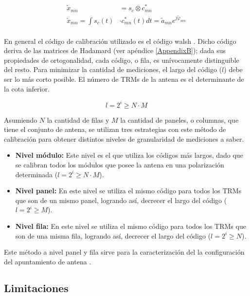 \begin{equation}
\begin{aligned}
	\tilde{x}_{mn} &= s_c \otimes c^*_{mn} \\
	\tilde{x}_{mn} = \int s_c(t) &\cdot c^*_{mn}(t) dt = \tilde{a}_{mn}e^{j\tilde{\varphi}_{mn}} \\
\end{aligned}
\label{eq:classic_correlation}
\end{equation}

En general el código de calibración utilizado es el código walsh \cite{Singhal2012}. Dicho código deriva de las matrices de 
Hadamard (ver apéndice \ref{AppendixB}); dada sus propiedades de ortogonalidad, cada código, o fila, es unívocamente 
distinguible del resto. Para minimizar la cantidad de mediciones, el largo del código ($l$) debe ser lo más corto posible. 
El número de TRMs de la antena es el determinante de la cota inferior.

\begin{equation}
	l = 2^i \ge N \cdot M
\end{equation}

Asumiendo $N$ la cantidad de filas y $M$ la cantidad de paneles, o columnas, que tiene el conjunto de antena, se utilizan tres
estrategias con este método de calibración para obtener distintos niveles de granularidad de mediciones a saber.

\begin{itemize}
	\item \textbf{Nivel módulo:} Este nivel es el que utiliza los códigos más largos, dado que se calibran todos los módulos que
		posee la antena en una polarización determinada ($l = 2^i \ge N \cdot M$).
	\item \textbf{Nivel panel:} En este nivel se utiliza el mismo código para todos los TRMs que son de un mismo panel,
		logrando así, decrecer el largo del código ($l = 2^i \ge M$).
	\item \textbf{Nivel fila:} En este nivel se utiliza el mismo código para todos los TRMs que son de una misma fila,
		logrando así, decrecer el largo del código ($l = 2^i \ge N$).
\end{itemize}

Este método a nivel panel y fila sirve para la caracterización del la configuración del apuntamiento de antena \cite{Br2007}.


\subsection{Limitaciones}

